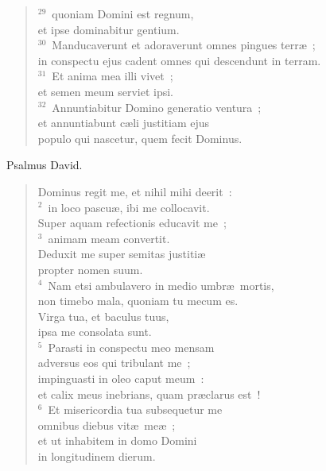 \begin{flushleft}
\begin{verse}
${}^{29}$~quoniam Domini est regnum,\\ et ipse dominabitur gentium.\\
${}^{30}$~Manducaverunt et adoraverunt omnes pingues terr\ae~;\\ in conspectu ejus cadent omnes qui descendunt in terram.\\
${}^{31}$~Et anima mea illi vivet~;\\ et semen meum serviet ipsi.\\
${}^{32}$~Annuntiabitur Domino generatio ventura~;\\ et annuntiabunt c\ae li justitiam ejus\\ populo qui nascetur, quem fecit Dominus.\end{verse}\end{flushleft}



\lettrine[lines=3,image=true,loversize=0.05,lraise=-0.03]{P}{}salmus David. \begin{flushleft}\begin{verse}\vspace{6pt}Dominus regit me, et nihil mihi deerit~:\\
${}^{2}$~in loco pascu\ae , ibi me collocavit.\\ Super aquam refectionis educavit me~;\\
${}^{3}$~animam meam convertit.\\ Deduxit me super semitas justiti\ae \\ propter nomen suum.\\
${}^{4}$~Nam etsi ambulavero in medio umbr\ae\ mortis,\\ non timebo mala, quoniam tu mecum es.\\ Virga tua, et baculus tuus,\\ ipsa me consolata sunt.\\
${}^{5}$~Parasti in conspectu meo mensam\\ adversus eos qui tribulant me~;\\ impinguasti in oleo caput meum~:\\ et calix meus inebrians, quam pr\ae clarus est~!\\
${}^{6}$~Et misericordia tua subsequetur me\\ omnibus diebus vit\ae\ me\ae~;\\ et ut inhabitem in domo Domini\\ in longitudinem dierum.\end{verse}\end{flushleft}



